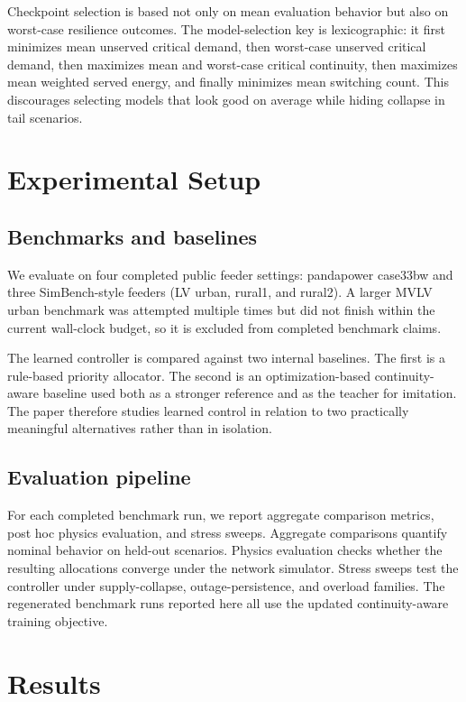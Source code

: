 \documentclass[11pt]{article}
\begin{document}
Checkpoint selection is based not only on mean evaluation behavior but also on worst-case resilience outcomes. The model-selection key is lexicographic: it first minimizes mean unserved critical demand, then worst-case unserved critical demand, then maximizes mean and worst-case critical continuity, then maximizes mean weighted served energy, and finally minimizes mean switching count. This discourages selecting models that look good on average while hiding collapse in tail scenarios.

\section{Experimental Setup}

\subsection{Benchmarks and baselines}

We evaluate on four completed public feeder settings: pandapower case33bw and three SimBench-style feeders (LV urban, rural1, and rural2). A larger MVLV urban benchmark was attempted multiple times but did not finish within the current wall-clock budget, so it is excluded from completed benchmark claims.

The learned controller is compared against two internal baselines. The first is a rule-based priority allocator. The second is an optimization-based continuity-aware baseline used both as a stronger reference and as the teacher for imitation. The paper therefore studies learned control in relation to two practically meaningful alternatives rather than in isolation.

\subsection{Evaluation pipeline}

For each completed benchmark run, we report aggregate comparison metrics, post hoc physics evaluation, and stress sweeps. Aggregate comparisons quantify nominal behavior on held-out scenarios. Physics evaluation checks whether the resulting allocations converge under the network simulator. Stress sweeps test the controller under supply-collapse, outage-persistence, and overload families. The regenerated benchmark runs reported here all use the updated continuity-aware training objective.

\section{Results}
\end{document}
